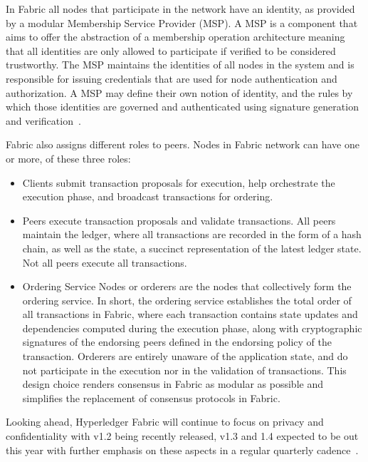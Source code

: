 In Fabric all nodes that participate in the network have an identity, as
provided by a modular Membership Service Provider (MSP).  A MSP is a component
that aims to offer the abstraction of a membership operation architecture
meaning that all identities are only allowed to participate if verified to be
considered trustworthy.  The MSP maintains the identities of all nodes in the
system and is responsible for issuing credentials that are used for node
authentication and authorization. A MSP may define their own notion of
identity, and the rules by which those identities are governed and
authenticated using signature generation and
verification~\cite{HyperledgerFabricDocs2017}.

Fabric also assigns different roles to peers. Nodes in Fabric network can have
one or more, of these three roles:

\begin{itemize}
  \item Clients submit transaction proposals for execution, help orchestrate
    the execution phase, and broadcast transactions for ordering.

  \item Peers execute transaction proposals and validate transactions.  All
    peers maintain the ledger, where all transactions  are recorded in the form
    of a hash chain, as well as the state, a succinct representation of the
    latest ledger state. Not all peers execute all transactions.

  \item Ordering Service Nodes or orderers are the nodes that collectively form
    the ordering service. In short, the ordering service establishes the total
    order of all transactions in Fabric, where each transaction contains state
    updates and dependencies computed during the execution phase, along with
    cryptographic signatures of the endorsing peers defined in the endorsing
    policy of the transaction. Orderers are entirely unaware of the application
    state, and do not participate in the execution nor in the validation of
    transactions. This design choice renders consensus in Fabric as modular as
    possible and simplifies the replacement of consensus protocols in Fabric. 
\end{itemize}

Looking ahead, Hyperledger Fabric will continue to focus on privacy and
confidentiality with v1.2 being recently released, v1.3 and 1.4 expected to be
out this year with further emphasis on these aspects in a regular quarterly
cadence~\cite{hyperledgerRoadmap2018}.
